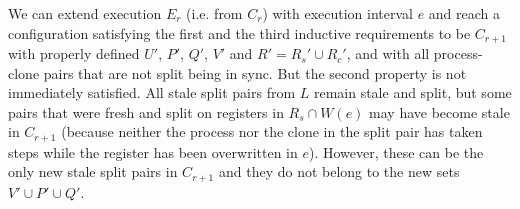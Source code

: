 \begin{claim}
\label{clm:casean}
We can extend execution $E_r$ (i.e. from $C_r$) with execution interval $e$ and reach a configuration 
  satisfying the first and the third inductive requirements to be $C_{r+1}$ 
  with properly defined $U'$, $P'$, $Q'$, $V'$ and $R' = R_s' \cup R_c'$,
  and with all process-clone pairs that are not split being in sync.
But the second property is not immediately satisfied.
All stale split pairs from $L$ remain stale and split, but some pairs that were fresh and split on registers 
  in $R_s \cap W(e)$ may have become stale in $C_{r+1}$ 
  (because neither the process nor the clone in the split pair has taken steps while the register has been overwritten in $e$). 
However, these can be the only new stale split pairs in $C_{r+1}$ and they do not belong to the new sets $V' \cup P' \cup Q'$.
\end{claim}
